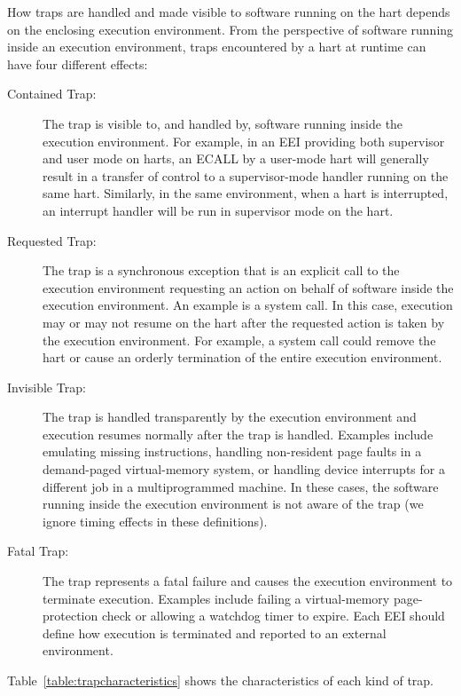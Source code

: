 How traps are handled and made visible to software running on the hart
depends on the enclosing execution environment.  From the perspective
of software running inside an execution environment, traps encountered
by a hart at runtime can have four different effects:
\begin{description}
  \item[Contained Trap:] The trap is visible to, and handled by,
    software running inside the execution environment.  For example,
    in an EEI providing both supervisor and user
    mode on harts, an ECALL by a user-mode hart will generally result
    in a transfer of control to a supervisor-mode handler running on
    the same hart.  Similarly, in the same environment, when a hart is
    interrupted, an interrupt handler will be run in supervisor mode
    on the hart.
  \item[Requested Trap:] The trap is a synchronous exception that is
    an explicit call to the execution environment requesting an action
    on behalf of software inside the execution environment.  An
    example is a system call.  In this case, execution may or may not
    resume on the hart after the requested action is taken by the
    execution environment.  For example, a system call could remove the
    hart or cause an orderly termination of the entire execution environment.
  \item[Invisible Trap:] The trap is handled transparently by the
    execution environment and execution resumes normally after the
    trap is handled.  Examples include emulating missing instructions,
    handling non-resident page faults in a demand-paged virtual-memory
    system, or handling device interrupts for a different job in a
    multiprogrammed machine.  In these cases, the software running
    inside the execution environment is not aware of the trap (we
    ignore timing effects in these definitions).
  \item[Fatal Trap:] The trap represents a fatal failure and causes
    the execution environment to terminate execution.  Examples
    include failing a virtual-memory page-protection check or allowing
    a watchdog timer to expire.  Each EEI should define how execution
    is terminated and reported to an external environment.
\end{description}

Table~\ref{table:trapcharacteristics} shows the characteristics of each
kind of trap.


